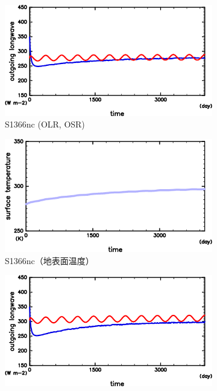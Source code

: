 \documentclass[body]{subfiles}
\begin{document}
\begin{figure}[t]
	\centering
	\begin{subfigure}{.4\textwidth}
		\centering
		\includegraphics[width=\textwidth]{S1366-nc/S1366nc_OLRA-OSRA_horimean_time0.0-4015.0-crop.png}
		\caption{S1366nc (OLR, OSR)}\label{S1366nc_OLRA}
	\end{subfigure}
	\begin{subfigure}{.4\textwidth}
		\centering
		\includegraphics[width=\textwidth]{S1366-nc/S1366nc_SurfTemp_horimean_time0.0-4015.0-crop.png}
		\caption{S1366nc（地表面温度）}\label{S1366nc_SurfTemp}
	\end{subfigure}
	\begin{subfigure}{.4\textwidth}
		\centering
		\includegraphics[width=\textwidth]{S1500-nc/S1500nc_OLRA-OSRA_horimean_time0.0-4015.0-crop.png}

\end{subfigure}
\end{figure}
\end{document}
